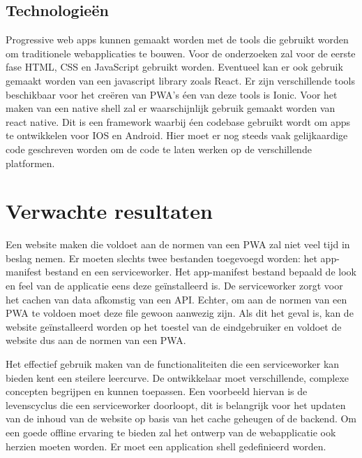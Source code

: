 \subsection{Technologieën}

Progressive web apps kunnen gemaakt worden met de tools die gebruikt worden om traditionele webapplicaties te bouwen. 
Voor de onderzoeken zal voor de eerste fase HTML, CSS en JavaScript gebruikt worden. Eventueel kan er ook gebruik gemaakt worden van een javascript library zoals React.
Er zijn verschillende tools beschikbaar voor het creëren van PWA’s éen van deze tools is Ionic.
Voor het maken van een native shell zal er waarschijnlijk gebruik gemaakt worden van react native. Dit is een framework waarbij éen codebase gebruikt wordt om apps te ontwikkelen voor IOS en Android. Hier moet er nog steeds vaak gelijkaardige code geschreven worden om de code te laten werken op de verschillende platformen.




\section{Verwachte resultaten}
\label{sec:verwachte_resultaten}


Een website maken die voldoet aan de normen van een PWA zal niet veel tijd in beslag nemen. Er moeten slechts twee bestanden toegevoegd worden: het app-manifest bestand en een serviceworker. Het app-manifest bestand bepaald de look en feel van de applicatie eens deze geïnstalleerd is. 
De serviceworker zorgt voor het cachen van data afkomstig van een API. Echter, om aan de normen van een PWA te voldoen moet deze file gewoon aanwezig zijn. 
Als dit het geval is, kan de website geïnstalleerd worden op het toestel van de eindgebruiker en voldoet de website dus aan de normen van een PWA.

Het effectief gebruik maken van de functionaliteiten die een serviceworker kan bieden kent een steilere leercurve. De ontwikkelaar moet verschillende, complexe concepten begrijpen en kunnen toepassen. 
Een voorbeeld hiervan is de levenscyclus die een serviceworker doorloopt, dit is belangrijk voor het updaten van de inhoud van de website op basis van het cache geheugen of de backend. 
Om een goede offline ervaring te bieden zal het ontwerp van de webapplicatie ook herzien moeten worden. Er moet een application shell gedefinieerd worden.
\autocite{Gaunt2019} \autocite{Osmani2016}

